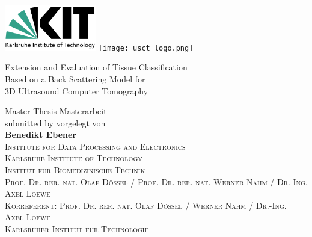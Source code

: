 \begin{titlingpage}
    \linespread{1.2}
\parindent0cm

\raggedright{ \includegraphics[width=4cm]{Graphics/KITlogo.pdf} \hfill \texttt{[image: usct\_logo.png]} }

   \vspace{3cm}


\begin{minipage}[c]{15.5cm}
\begin{center}
   \begin{huge}
   \hspace{-1cm}
     Extension and Evaluation of Tissue Classification\\
   \hspace{-1cm}
     Based on a Back Scattering Model for\\
   \hspace{-1cm}
      3D Ultrasound Computer Tomography\\
   \end{huge}
\end{center}
\end{minipage}
\vfill
\begin{minipage}[c]{15.5cm}
   \begin{center}

    {\Large
     \ifenglish
     Master Thesis
 	\else
    Masterarbeit
	\fi
	}\\

    \vspace{0.5cm}
     {\large
      \ifenglish
        submitted by
      \else
        vorgelegt von
      \fi
      }\\
    \vspace{0.5cm}
     \textbf{\Large Benedikt Ebener}
   \vspace{4cm} \\


 \textsc{
 \ifenglish
   Institute for Data Processing and Electronics\\
   Karlsruhe Institute of Technology\\
 \else
    Institut f\"ur Biomedizinische Technik\\
    Prof. Dr. rer. nat. Olaf D\"ossel / Prof. Dr. rer. nat. Werner Nahm / Dr.-Ing. Axel Loewe\\
    Korreferent: Prof. Dr. rer. nat. Olaf D\"ossel / Werner Nahm / Dr.-Ing. Axel Loewe\\
    Karlsruher Institut f\"ur Technologie\\
 \fi
 }


\end{center}
\end{minipage}
\end{titlingpage}
